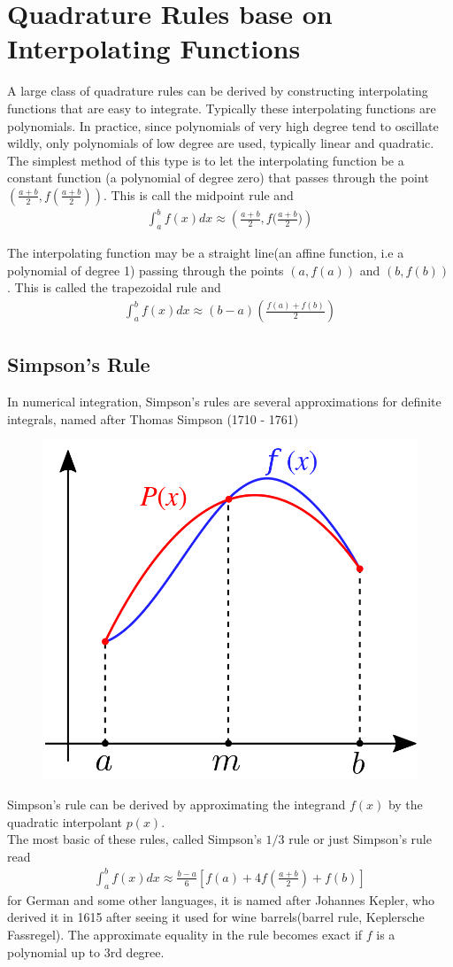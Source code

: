 \documentclass[12pt]{report}
\newcommand{\sps}{\\[0.2cm]}
\newcommand{\dsp}{\displaystyle}
\newcommand{\NI}{\noindent}
\begin{document}
	\section{Quadrature Rules base on Interpolating Functions}
	A large class of quadrature rules can be derived by constructing interpolating functions that are easy to integrate. Typically these interpolating functions are polynomials. In practice, since polynomials of very high degree tend to oscillate wildly, only polynomials of low degree are used, typically linear and quadratic.\sps
	The simplest method of this type is to let the interpolating function be a constant function (a polynomial of degree zero) that passes through the point $\dsp \left(\frac{a+b}{2}, f\left(\frac{a+b}{2}\right)\right)$. This is call the midpoint rule and 
	\begin{eqnarray}
		\int_a^b f(x) dx \approx  \left(\frac{a+b}{2}, f\bigg(\frac{a+b}{2}\bigg)\right)
	\end{eqnarray}

	\NI The interpolating function may be a straight line(an affine function, i.e a polynomial of degree 1) passing through the points $(a,f(a))$ and $(b,f(b))$. This is called the trapezoidal rule and
	\begin{eqnarray}
		\int_a^b f(x) dx \approx (b-a)\left(\frac{f(a) + f(b)}{2}\right)
	\end{eqnarray}
	
	\subsection{Simpson's Rule}
	In numerical integration, Simpson's rules are several approximations for definite integrals, named after Thomas Simpson (1710 - 1761)
	\begin{figure}[!h]
		\centering
		\includegraphics[width=.4\linewidth]{Simpsons_method_illustration}
	\end{figure}
	\NI Simpson's rule can be derived by approximating the integrand $f(x)$ by the quadratic interpolant $p(x)$.\sps
	The most basic of these rules, called Simpson's $1/3$ rule or just Simpson's rule read
	\begin{eqnarray}
		\int_a^b f(x) dx \approx \frac{b-a}{6}\left[f(a)+ 4f\left(\frac{a+b}{2}\right) + f(b) \right]  
	\end{eqnarray}
	for German and some other languages, it is named after Johannes Kepler, who derived it in 1615 after seeing it used for wine barrels(barrel rule, Keplersche Fassregel). The approximate equality in the rule becomes exact if $f$ is a polynomial up to 3rd degree.
	
\end{document}
